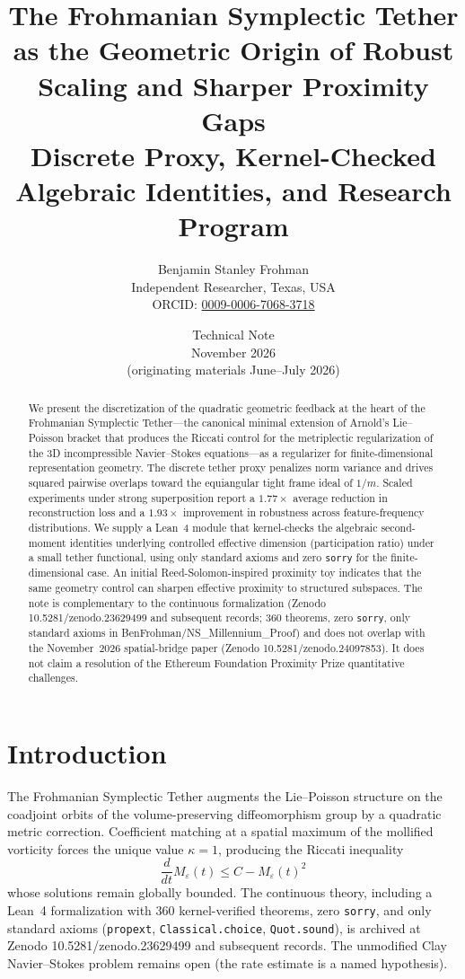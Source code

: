 \documentclass[11pt,a4paper]{article}
\title{The Frohmanian Symplectic Tether as the Geometric Origin of Robust Scaling and Sharper Proximity Gaps\\ Discrete Proxy, Kernel-Checked Algebraic Identities, and Research Program}
\author{Benjamin Stanley Frohman\\ Independent Researcher, Texas, USA\\ ORCID: \href{https://orcid.org/0009-0006-7068-3718}{0009-0006-7068-3718}}
\date{Technical Note\\ November 2026\\ (originating materials June--July 2026)}
\begin{document}
\maketitle
{}\par


\begin{abstract}
We present the discretization of the quadratic geometric feedback at the heart of the Frohmanian Symplectic Tether---the canonical minimal extension of Arnold's Lie--Poisson bracket that produces the Riccati control for the metriplectic regularization of the 3D incompressible Navier--Stokes equations---as a regularizer for finite-dimensional representation geometry. The discrete tether proxy penalizes norm variance and drives squared pairwise overlaps toward the equiangular tight frame ideal of $1/m$. Scaled experiments under strong superposition report a $1.77\times$ average reduction in reconstruction loss and a $1.93\times$ improvement in robustness across feature-frequency distributions. We supply a Lean~4 module that kernel-checks the algebraic second-moment identities underlying controlled effective dimension (participation ratio) under a small tether functional, using only standard axioms and zero \texttt{sorry} for the finite-dimensional case. An initial Reed-Solomon-inspired proximity toy indicates that the same geometry control can sharpen effective proximity to structured subspaces. The note is complementary to the continuous formalization (Zenodo 10.5281/zenodo.23629499 and subsequent records; 360 theorems, zero \texttt{sorry}, only standard axioms in BenFrohman/NS\_Millennium\_Proof) and does not overlap with the November~2026 spatial-bridge paper (Zenodo 10.5281/zenodo.24097853). It does not claim a resolution of the Ethereum Foundation Proximity Prize quantitative challenges.
\end{abstract}

\section{Introduction}
The Frohmanian Symplectic Tether augments the Lie--Poisson structure on the coadjoint orbits of the volume-preserving diffeomorphism group by a quadratic metric correction. Coefficient matching at a spatial maximum of the mollified vorticity forces the unique value $\kappa=1$, producing the Riccati inequality
\[
\frac{d}{dt}M_\varepsilon(t)\le C-M_\varepsilon(t)^2
\]
whose solutions remain globally bounded. The continuous theory, including a Lean~4 formalization with 360 kernel-verified theorems, zero \texttt{sorry}, and only standard axioms (\texttt{propext}, \texttt{Classical.choice}, \texttt{Quot.sound}), is archived at Zenodo 10.5281/zenodo.23629499 and subsequent records. The unmodified Clay Navier--Stokes problem remains open (the rate estimate is a named hypothesis).
\end{document}
